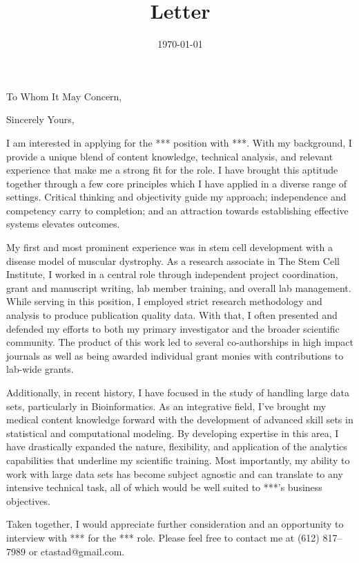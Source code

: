 \documentclass[10pt,letter,sans]{moderncv}
\makeatletter
\newcommand{\myphone}{(612) 817--7989}
\newcommand{\myemail}{ctastad@gmail.com}
\newcommand{\company}{***}
\newcommand{\role}{***}
\makeatother
\begin{document}

\title{Letter}
\recipient{HR Department}{\company{} \\ STREET ADDRESS \\ CITY, STATE ZIP}
\date{\today}
\opening{To Whom It May Concern,}
\closing{Sincerely Yours,}
\makelettertitle{}

I am interested in applying for the \role{} position with \company{}. With my background, I provide a unique blend of content knowledge, technical analysis, and relevant experience that make me a strong fit for the role. I have brought this aptitude together through a few core principles which I have applied in a diverse range of settings. Critical thinking and objectivity guide my approach; independence and competency carry to completion; and an attraction towards establishing effective systems elevates outcomes.

My first and most prominent experience was in stem cell development with a disease model of muscular dystrophy. As a research associate in The Stem Cell Institute, I worked in a central role through independent project coordination, grant and manuscript writing, lab member training, and overall lab management. While serving in this position, I employed strict research methodology and analysis to produce publication quality data. With that, I often presented and defended my efforts to both my primary investigator and the broader scientific community. The product of this work led to several co-authorships in high impact journals as well as being awarded individual grant monies with contributions to lab-wide grants.

Additionally, in recent history, I have focused in the study of handling large data sets, particularly in Bioinformatics. As an integrative field, I've brought my medical content knowledge forward with the development of advanced skill sets in statistical and computational modeling. By developing expertise in this area, I have drastically expanded the nature, flexibility, and application of the analytics capabilities that underline my scientific training. Most importantly, my ability to work with large data sets has become subject agnostic and can translate to any intensive technical task, all of which would be well suited to \company{}'s business objectives.

Taken together, I would appreciate further consideration and an opportunity to interview with \company{} for the \role{} role. Please feel free to contact me at \myphone{} or \myemail{}.
\end{document}
